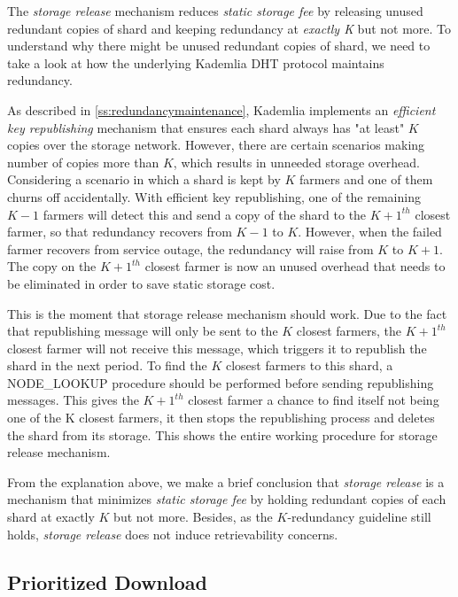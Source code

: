 The \textit{storage release} mechanism reduces \textit{static storage fee} by releasing unused redundant copies of shard and keeping redundancy at \textit{exactly K} but not more. To understand why there might be unused redundant copies of shard, we need to take a look at how the underlying Kademlia DHT protocol maintains redundancy.

As described in \ref{ss:redundancymaintenance}, Kademlia implements an \textit{efficient key republishing} mechanism that ensures each shard always has "at least" $K$ copies over the storage network. However, there are certain scenarios making number of copies more than $K$, which results in unneeded storage overhead. Considering a scenario in which a shard is kept by $K$ farmers and one of them churns off accidentally. With efficient key republishing, one of the remaining $K-1$
farmers will detect this and send a copy of the shard to the $K+1^{th}$ closest farmer, so that redundancy recovers from $K-1$ to $K$. However, when the failed farmer recovers from service outage, the redundancy will raise from $K$ to $K+1$. The copy on the $K+1^{th}$ closest farmer is now an unused overhead that needs to be eliminated in order to save static storage cost.

This is the moment that storage release mechanism should work. Due to the fact that republishing message will only be sent to the $K$ closest farmers, the $K+1^{th}$ closest farmer will not receive this message, which triggers it to republish the shard in the next period. To find the $K$ closest farmers to this shard, a NODE\_LOOKUP procedure should be performed before sending republishing messages. This gives the $K+1^{th}$ closest farmer a chance to find itself not being one of the K closest farmers, it then stops the republishing process and deletes the shard from its storage. This shows the entire working procedure for storage release mechanism.

From the explanation above, we make a brief conclusion that \textit{storage release} is a mechanism that minimizes \textit{static storage fee} by holding redundant copies of each shard at exactly $K$ but not more. Besides, as the $K$-redundancy guideline still holds, \textit{storage release} does not induce retrievability concerns.

\subsection{Prioritized Download}
\label{ss:prioritizeddownload}

